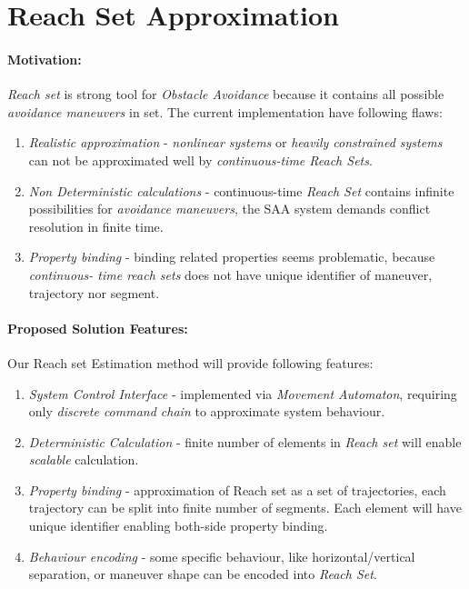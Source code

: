 \cleardoublepage
\section{Reach Set Approximation}\label{s:reachSet}

    \noindent\paragraph{Motivation:} \emph{Reach set} is strong tool for \emph{Obstacle Avoidance} because it contains all possible \emph{avoidance maneuvers} in set. The current implementation have following flaws:
    
    \begin{enumerate}
        \item \emph{Realistic approximation} - \emph{nonlinear systems} or \emph{heavily constrained systems} can not be approximated well by \emph{continuous-time Reach Sets}.
        
        \item \emph{Non Deterministic calculations} - continuous-time \emph{Reach Set} contains  infinite possibilities for \emph{avoidance maneuvers}, the SAA system demands conflict resolution in finite time.
        
        \item \emph{Property binding} - binding related properties seems problematic, because \emph{continuous- time reach sets} does not have unique identifier of maneuver, trajectory nor segment. 
    \end{enumerate}
    
    \paragraph{Proposed Solution Features:} Our Reach set Estimation method will provide following features:
    
    \begin{enumerate}
        \item \emph{System Control Interface} - implemented via \emph{Movement Automaton}, requiring only \emph{discrete command chain} to approximate system behaviour.
        
        \item \emph{Deterministic Calculation} - finite number of elements in \emph{Reach set} will enable \emph{scalable} calculation.
        
        \item \emph{Property binding} - approximation of Reach set as a set of trajectories, each trajectory can be split into finite number of segments. Each element will have unique identifier enabling both-side  property binding.
        
        \item \emph{Behaviour encoding} - some specific behaviour, like horizontal/vertical separation, or maneuver shape can be encoded into \emph{Reach Set}.
    \end{enumerate}
    
